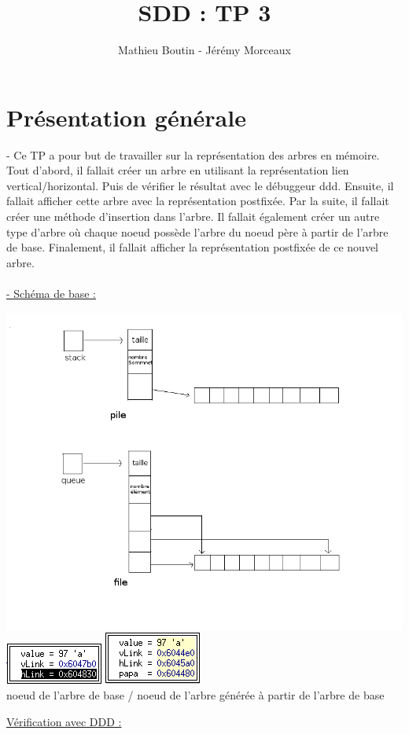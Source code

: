 \documentclass[a4paper]{article}
\title{SDD : TP 3}
\author{Mathieu Boutin - Jérémy Morceaux}
\begin{document}
\maketitle
\section{Présentation générale}
- Ce TP a pour but de travailler sur la représentation des arbres en mémoire. Tout d'abord, il fallait créer un arbre en utilisant la représentation lien vertical/horizontal. Puis de vérifier le résultat avec le débuggeur ddd. Ensuite, il fallait afficher cette arbre avec la représentation postfixée. Par la suite, il fallait créer une méthode d'insertion dans l'arbre. Il fallait également créer un autre type d'arbre où chaque noeud possède l'arbre du noeud père à partir de l'arbre de base. Finalement, il fallait afficher la représentation postfixée de ce nouvel arbre.
\\
\\
\underline{- Schéma de base :}
\begin{center}
\includegraphics[scale=0.4]{Schema_base.png}
\\
\includegraphics[scale=1]{structure_arbre_base.png}
\includegraphics[scale=1]{structure_arbre_modifie.png}
\\
noeud de l'arbre de base / noeud de l'arbre générée à partir de l'arbre de base
\end{center}
\underline{Vérification avec DDD :}
\end{document}
